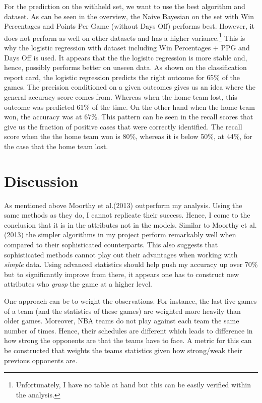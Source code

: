 \documentclass[11pt,a4paper,leqno]{article}
\begin{document}
For the prediction on the withheld set, we want to use the best algorithm and dataset. As can be seen in the overview, the Naive Bayesian on the set with Win Percentages and Points Per Game (without Days Off) performs best. However, it does not perform as well on other datasets and has a higher variance.\footnote{Unfortunately, I have no table at hand but this can be easily verified within the analysis.} This is why the logistic regression with dataset including Win Percentages + PPG and Days Off is used. It appears that the the logisitc regression is more stable and, hence, possibly performs better on unseen data.  As shown on the classification report card, the logistic regression predicts the right outcome for 65\% of the games. The precision conditioned on a given outcomes gives us an idea where the general accuracy score comes from. Whereas when the home team lost, this outcome was predicted 61\% of the time. On the other hand when the home team won, the accuracy was at 67\%. This pattern can be seen in the recall scores that give us the fraction of positive cases that were correctly identified. The recall score when the the home team won is 80\%, whereas it is below 50\%, at 44\%, for the case that the home team lost.

\section{Discussion}

As mentioned above Moorthy et al.(2013) outperform my analysis. Using the same methods as they do, I cannot replicate their success.  Hence, I come to the conclusion that it is in the attributes not in the models. Similar to Moorthy et al.(2013) the simpler algorithms in my project perform remarkably well when compared to their sophisticated counterparts. This also suggests that sophisticated methods cannot play out their advantages when working with \textit{simple} data. Using advanced statistics should help push my accuracy up over 70\% but to significantly improve from there, it appears one has to construct new attributes who \textit{grasp} the game at a higher level.

One approach can be to weight the observations. For instance, the last five games of a team (and the statistics of these games) are weighted more heavily than older games. Moreover, NBA teams do not play against each team the same number of times. Hence, their schedules are different which leads to difference in how strong the opponents are that the teams have to face. A metric for this can be constructed that weights the teams statistics given how strong/weak their previous opponents are.
\end{document}
